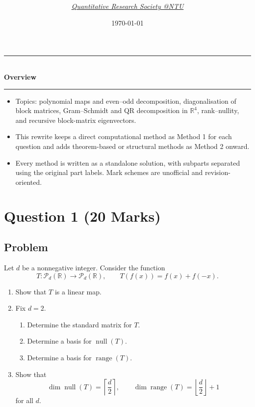 \documentclass[12pt]{article}
\title{
\Huge \CourseCode\ \CourseName \\[0.3em]
\Large \DocType  \\[0.3em]
\large \ExamMeta
}
\author{
  \textit{\href{https://qrsntu.org}{Quantitative Research Society @NTU}}
}
\date{\today}
\newcommand{\R}{\mathbb{R}}
\newcommand{\Ppoly}{\mathcal{P}}
\newcommand{\Null}{\operatorname{null}}
\newcommand{\Range}{\operatorname{range}}
\newenvironment{overview}{
  \par\bigskip
  \begin{center}
    \rule{0.92\linewidth}{0.6pt}\\[-0.2em]
    \textbf{Overview}\\[-0.2em]
    \rule{0.92\linewidth}{0.6pt}
  \end{center}
  \vspace{-0.3em}
  \begin{itemize}[leftmargin=1.6em, itemsep=0.2em, topsep=0.2em]
}{
  \end{itemize}
  \par\bigskip
}
\begin{document}
\maketitle
\thispagestyle{plainfirst}
\setlength{\headheight}{14.5pt}
\pagestyle{main}

\begin{overview}
  \item Topics: polynomial maps and even--odd decomposition, diagonalisation of block matrices, Gram--Schmidt and QR decomposition in $\R^4$, rank--nullity, and recursive block-matrix eigenvectors.
  \item This rewrite keeps a direct computational method as Method 1 for each question and adds theorem-based or structural methods as Method 2 onward.
  \item Every method is written as a standalone solution, with subparts separated using the original part labels. Mark schemes are unofficial and revision-oriented.
\end{overview}

\newpage
\tableofcontents
\newpage

\section{Question 1 \hfill (20 Marks)}

\subsection{Problem}
Let $d$ be a nonnegative integer. Consider the function
\[
T:\Ppoly_d(\R)\to\Ppoly_d(\R),
\qquad
T(f(x))=f(x)+f(-x).
\]
\begin{enumerate}[label=(\alph*)]
  \item Show that $T$ is a linear map.
  \item Fix $d=2$.
  \begin{enumerate}[label=(\roman*)]
    \item Determine the standard matrix for $T$.
    \item Determine a basis for $\Null(T)$.
    \item Determine a basis for $\Range(T)$.
  \end{enumerate}
  \item Show that
  \[
  \dim\Null(T)=\left\lceil\frac d2\right\rceil,
  \qquad
  \dim\Range(T)=\left\lfloor\frac d2\right\rfloor+1
  \]
  for all $d$.
\end{enumerate}
\end{document}

